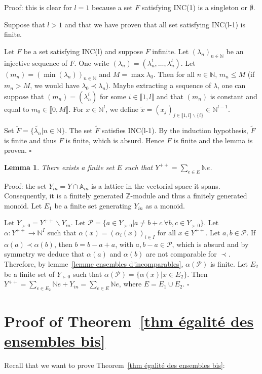 \documentclass[12pt]{article}
\theoremstyle{plain}
\newtheorem{lemme}[thm]{Lemma}
\theoremstyle{definition}
\newcommand{\A}{\mathbb{A}}
\newcommand{\N}{\mathbb{N}}
\newcommand{\Z}{\mathbb{Z}}
\begin{document}
Proof: this  is clear for $l=1$ because a set $F$ satisfying INC(1) is a singleton or $\emptyset$. 

Suppose that $l>1$ and that we have proven that all set satisfying INC(l-1) is finite.

 Let $F$ be a set  satisfying INC(l) and suppose $F$ infinite. Let $(\lambda_n)_{n\in \N}$ be an injective sequence of $F$. One write $(\lambda_n)=(\lambda_n^1,\ldots,\lambda_n^l)$. Let $(m_n)=(\min(\lambda_n))_{n\in \N}$ and $M=\max \lambda_{0}$. Then for all $n\in \N$, $m_n\leq M$ (if $m_n>M$, we would have $\lambda_{0}\prec \lambda_n$). Maybe extracting a sequence of $\lambda$, one can suppose that $(m_n)=(\lambda_n^i)$ for some $i\in \llbracket 1, l\rrbracket$ and that $(m_n)$ is constant and equal to $m_0\in \llbracket 0,M\rrbracket$. For $x\in \N^l$, we define $\tilde{x}=(x_j)_{j\in \llbracket 1,l\rrbracket\backslash \{i\}}\in \N^{l-1}$. 
 
 Set $\tilde{F}=\{\tilde{\lambda_n}|n\in\N\}$. The set $\tilde{F}$ satisfies INC(l-1). By the induction hypothesis, $\tilde{F}$ is finite and thus $F$ is finite, which is absurd. Hence $F$ is finite and the lemma is proven. $\square$

\begin{lemme}\label{lemme description de Y^{++}}
There exists a finite set $E$ such that $Y^{++}=\sum_{e\in E}\N e$.
\end{lemme}

Proof: the set $Y_{in}=Y\cap\A_{in}$ is a lattice in the vectorial space it spans. Consequently, it is a finitely generated $\Z$-module and thus a finitely generated monoid. Let $E_1$ be a finite set generating $Y_{in}$ as a monoid.

 Let $Y_{\succ 0}=Y^{++}\backslash Y_{in}$. Let $\mathcal{P}=\{a\in Y_{\succ 0}|a\neq b+c\ \forall b,c\in Y_{\succ 0}\}$. Let $\alpha:Y^{++}\rightarrow \N^{I}$ such that 
 $\alpha(x)=(\alpha_i(x))_{i\in I}$ for all $x\in Y^{++}$. Let $a,b\in \mathcal{P}$.
  If $\alpha(a)\prec \alpha(b)$, then $b=b-a+a$, with $a,b-a\in \mathcal{P}$, which is absurd and by symmetry we deduce that $\alpha(a)$ and $\alpha(b)$ are not comparable for $\prec$. 
Therefore, by lemme~\ref{lemme ensembles d'incomparables}, $\alpha(\mathcal{P})$ is finite. Let $E_2$ be a finite set of $Y_{\succ 0}$ such that $\alpha(\mathcal{P})=\{\alpha(x)|x\in E_2\}$. Then $Y^{++}=\sum_{e\in E_2}\N e+Y_{in}=\sum_{e\in E}\N e$, where $E=E_1\cup E_2$. $\square$

 

\section{Proof of Theorem~\ref{thm égalité des ensembles bis}}\label{sect proof of final theorem}
Recall that we want to prove Theorem~\ref{thm égalité des ensembles bis}: 
\end{document}
